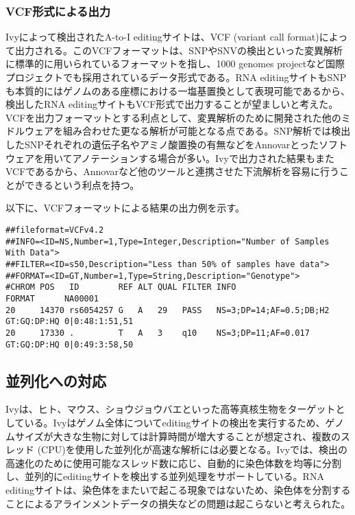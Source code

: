 \subsubsection{VCF形式による出力}
Ivyによって検出されたA-to-I editingサイトは、VCF (variant call format)によって出力される。このVCFフォーマットは、SNPやSNVの検出といった変異解析に標準的に用いられているフォーマットを指し、1000 genomes projectなど国際プロジェクトでも採用されているデータ形式である。RNA editingサイトもSNPも本質的にはゲノムのある座標における一塩基置換として表現可能であるから、検出したRNA editingサイトもVCF形式で出力することが望ましいと考えた。VCFを出力フォーマットとする利点として、変異解析のために開発された他のミドルウェアを組み合わせた更なる解析が可能となる点である。SNP解析では検出したSNPそれぞれの遺伝子名やアミノ酸置換の有無などをAnnovarとったソフトウェアを用いてアノテーションする場合が多い。Ivyで出力された結果もまたVCFであるから、Annovarなど他のツールと連携させた下流解析を容易に行うことができるという利点を持つ。
\par
以下に、VCFフォーマットによる結果の出力例を示す。

\scriptsize
\begin{verbatim}
##fileformat=VCFv4.2
##INFO=<ID=NS,Number=1,Type=Integer,Description="Number of Samples With Data">
##FILTER=<ID=s50,Description="Less than 50% of samples have data">
##FORMAT=<ID=GT,Number=1,Type=String,Description="Genotype">
#CHROM POS   ID        REF ALT QUAL FILTER INFO                    FORMAT      NA00001        
20     14370 rs6054257 G   A   29   PASS   NS=3;DP=14;AF=0.5;DB;H2 GT:GQ:DP:HQ 0|0:48:1:51,51 
20     17330 .         T   A   3    q10    NS=3;DP=11;AF=0.017     GT:GQ:DP:HQ 0|0:49:3:58,50 
\end{verbatim}
\normalsize

\subsection{並列化への対応}
Ivyは、ヒト、マウス、ショウジョウバエといった高等真核生物をターゲットとしている。Ivyはゲノム全体についてeditingサイトの検出を実行するため、ゲノムサイズが大きな生物に対しては計算時間が増大することが想定され、複数のスレッド (CPU)を使用した並列化が高速な解析には必要となる。Ivyでは、検出の高速化のために使用可能なスレッド数に応じ、自動的に染色体数を均等に分割し、並列的にeditingサイトを検出する並列処理をサポートしている。RNA editingサイトは、染色体をまたいで起こる現象ではないため、染色体を分割することによるアラインメントデータの損失などの問題は起こらないと考えられた。

